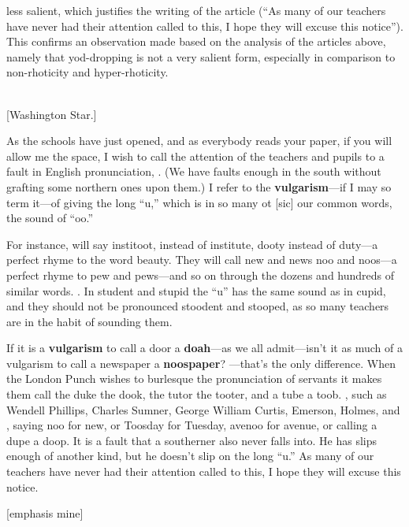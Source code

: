 less salient, which justifies the writing of the article (“As many of our teachers have never had their attention called to this, I hope they will excuse this notice”). This confirms an observation made based on the analysis of the articles above, namely that yod-dropping is not a very salient form, especially in comparison to non-rhoticity and hyper-rhoticity.

\begin{ipquote}
\begin{center}
\\
{[Washington Star.]}
\end{center}
As the schools have just opened, and as everybody reads your paper, if you will allow me the space, I wish to call the attention of the teachers and pupils to a fault in English pronunciation, . (We have faults enough in the south without grafting some northern ones upon them.) I refer to the \textbf{vulgarism}—if I may so term it—of giving the long “u,” which is in so many ot [sic] our common words, the sound of “oo.”

For instance,  will say institoot, instead of institute, dooty instead of duty—a perfect rhyme to the word beauty. They will call new and news noo and noos—a perfect rhyme to pew and pews—and so on through the dozens and hundreds of similar words. . In student and stupid the “u” has the same sound as in cupid, and they should not be pronounced stoodent and stooped, as so many teachers are in the habit of sounding them.

{If it is a \textbf{vulgarism} to call a door a \textbf{doah}—as we all admit—isn’t it as much of a vulgarism to call a newspaper a \textbf{noospaper}? —that’s the only difference. When the London Punch wishes to burlesque the pronunciation of servants it makes them call the duke the dook, the tutor the tooter, and a tube a toob. , such as Wendell Phillips, Charles Sumner, George William Curtis, Emerson, Holmes, and , saying noo for new, or Toosday for Tuesday, avenoo for avenue, or calling a dupe a doop. It is a fault that a southerner also never falls into. He has slips enough of another kind, but he do{\kern0pt}esn’t slip on the long “u.” As many of our teachers have never had their attention called to this, I hope they will excuse this notice.

\raggedleft
{[emphasis mine]}\\
}
\end{ipquote}


